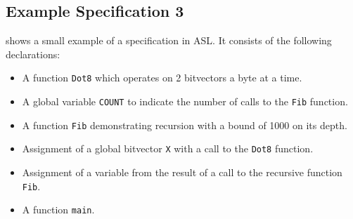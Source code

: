\begin{center}

\end{center}

\subsection{Example Specification 3}
 shows a small example of a specification in ASL. It consists of the following declarations:
\begin{itemize}
    \item A function \texttt{Dot8} which operates on 2 bitvectors a byte at a time.
    \item A global variable \texttt{COUNT} to indicate the number of calls to the \texttt{Fib} function.
    \item A function \texttt{Fib} demonstrating recursion with a bound of 1000 on its depth.
    \item Assignment of a global bitvector \texttt{X} with a call to the \texttt{Dot8} function.
    \item Assignment of a variable from the result of a call to the recursive function \texttt{Fib}.
    \item A function \texttt{main}.
\end{itemize}


